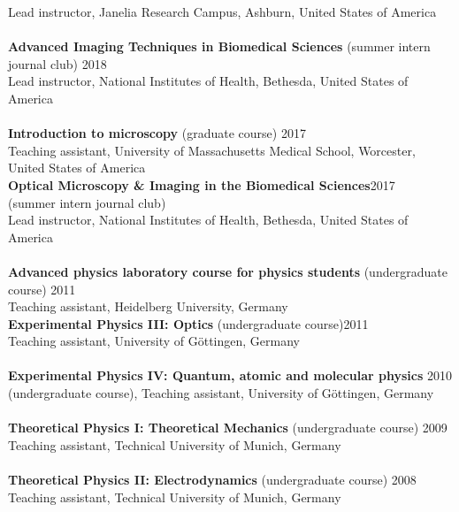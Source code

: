 \documentclass[margin,line]{res}
\begin{document}
\begin{resume}
Lead instructor, Janelia Research Campus, Ashburn, United States of America\\
\vspace*{-3mm}\\
{\bf Advanced Imaging Techniques in Biomedical Sciences} (summer intern journal club) \hfill {2018}\\
Lead instructor, National Institutes of Health, Bethesda, United States of America \\
\vspace*{-3mm}\\
{\bf Introduction to microscopy} (graduate course) \hfill {2017}\\
Teaching assistant, University of Massachusetts Medical School, Worcester, \\
United States of America\\
{\bf Optical Microscopy \& Imaging in the Biomedical Sciences}\hfill {2017}\\
 (summer intern journal club) \\
 Lead instructor, National Institutes of Health, Bethesda, United States of America \\
\vspace*{-3mm}\\
{\bf Advanced physics laboratory course for physics students} (undergraduate course) \hfill {2011}\\
Teaching assistant, Heidelberg University, Germany\\
{\bf Experimental Physics III: Optics}  (undergraduate course)\hfill {2011}\\
Teaching assistant, University of Göttingen, Germany \\
\vspace*{-3mm}\\
{\bf Experimental Physics IV: Quantum, atomic and molecular physics}  \hfill {2010}\\
(undergraduate course), Teaching assistant, University of Göttingen, Germany\\
\vspace*{-3mm}\\
{\bf Theoretical Physics I: Theoretical Mechanics} (undergraduate course) \hfill {2009}\\
Teaching assistant, Technical University of Munich, Germany\\
\vspace*{-3mm}\\
{\bf Theoretical Physics II: Electrodynamics} (undergraduate course) \hfill {2008}\\
Teaching assistant, Technical University of Munich, Germany\\


\end{resume}
\end{document}
